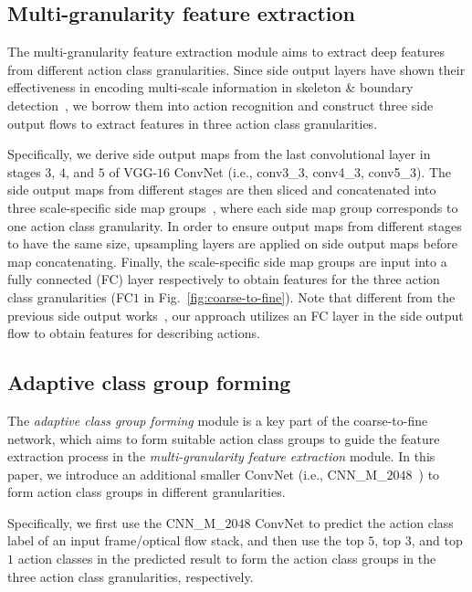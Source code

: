 \documentclass[letterpaper]{article}
\begin{document}
\subsection{Multi-granularity feature extraction}


The multi-granularity feature extraction module aims to extract deep features from different action class granularities. Since side output layers have shown their effectiveness in encoding multi-scale information in skeleton \& boundary detection~\cite{skeleton,skeleton2}, we borrow them into action recognition and construct three side output flows to extract features in three action class granularities.

Specifically, we derive side output maps from the last convolutional layer in stages $3$, $4$, and $5$ of VGG-$16$ ConvNet (i.e., conv3\_3, conv4\_3, conv5\_3). The side output maps from different stages are then sliced and concatenated into three scale-specific side map groups~\cite{skeleton}, where each side map group corresponds to one action class granularity. In order to ensure output maps from different stages to have the same size, upsampling layers are applied on side output maps before map concatenating. Finally, the scale-specific side map groups are input into a fully connected (FC) layer respectively to obtain features for the three action class granularities (FC$1$ in  Fig.~\ref{fig:coarse-to-fine}). Note that different from the previous side output works~\cite{skeleton,skeleton2}, our approach utilizes an FC layer in the side output flow  to obtain features for describing actions.








\subsection{Adaptive class group forming}

The \emph{adaptive class group forming} module is a key part of the coarse-to-fine network, which aims to form suitable action class groups to guide the feature extraction process in the \emph{multi-granularity feature extraction} module. In this paper, we introduce an additional smaller ConvNet (i.e., CNN\_M\_$2048$~\cite{M2048}) to form action class groups in different granularities.

Specifically, we first use the CNN\_M\_$2048$ ConvNet to predict the action class label of an input frame/optical flow stack, and then use the top $5$, top $3$, and top $1$ action classes in the predicted result to form the action class groups in the three action class granularities, respectively.
\end{document}
